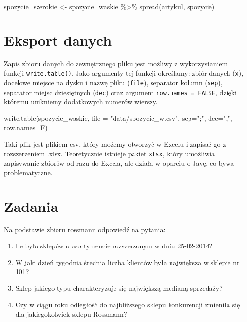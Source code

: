 \documentclass[
  letterpaper,
  DIV=11,
  numbers=noendperiod]{scrreprt}
\newenvironment{Shaded}{\begin{snugshade}}{\end{snugshade}}
\newcommand{\AttributeTok}[1]{\textcolor[rgb]{0.40,0.45,0.13}{#1}}
\newcommand{\FunctionTok}[1]{\textcolor[rgb]{0.28,0.35,0.67}{#1}}
\newcommand{\NormalTok}[1]{\textcolor[rgb]{0.00,0.23,0.31}{#1}}
\newcommand{\OtherTok}[1]{\textcolor[rgb]{0.00,0.23,0.31}{#1}}
\newcommand{\SpecialCharTok}[1]{\textcolor[rgb]{0.37,0.37,0.37}{#1}}
\newcommand{\StringTok}[1]{\textcolor[rgb]{0.13,0.47,0.30}{#1}}
\providecommand{\tightlist}{%
  \setlength{\itemsep}{0pt}\setlength{\parskip}{0pt}}\usepackage{longtable,booktabs,array}
\begin{document}
\begin{Shaded}
\begin{Highlighting}[]
\NormalTok{spozycie\_szerokie }\OtherTok{\textless{}{-}}\NormalTok{ spozycie\_waskie }\SpecialCharTok{\%\textgreater{}\%}
  \FunctionTok{spread}\NormalTok{(artykul, spozycie)}
\end{Highlighting}
\end{Shaded}

\hypertarget{eksport-danych}{%
\section{Eksport danych}\label{eksport-danych}}

Zapis zbioru danych do zewnętrznego pliku jest możliwy z wykorzystaniem
funkcji \texttt{write.table()}. Jako argumenty tej funkcji określamy:
zbiór danych (\texttt{x}), docelowe miejsce na dysku i nazwę pliku
(\texttt{file}), separator kolumn (\texttt{sep}), separator miejsc
dziesiętnych (\texttt{dec}) oraz argument \texttt{row.names\ =\ FALSE},
dzięki któremu unikniemy dodatkowych numerów wierszy.

\begin{Shaded}
\begin{Highlighting}[]
\FunctionTok{write.table}\NormalTok{(spozycie\_waskie, }\AttributeTok{file =} \StringTok{"data/spozycie\_w.csv"}\NormalTok{, }\AttributeTok{sep=}\StringTok{";"}\NormalTok{, }\AttributeTok{dec=}\StringTok{","}\NormalTok{, }\AttributeTok{row.names=}\NormalTok{F)}
\end{Highlighting}
\end{Shaded}

Taki plik jest plikiem csv, który możemy otworzyć w Excelu i zapisać go
z rozszerzeniem .xlsx. Teoretycznie istnieje pakiet \texttt{xlsx}, który
umożliwia zapisywanie zbiorów od razu do Excela, ale działa w oparciu o
Javę, co bywa problematyczne.

\hypertarget{zadania-2}{%
\section{Zadania}\label{zadania-2}}

Na podstawie zbioru rossmann odpowiedź na pytania:

\begin{enumerate}
\def\labelenumi{\arabic{enumi}.}
\tightlist
\item
  Ile było sklepów o asortymencie rozszerzonym w dniu 25-02-2014?
\item
  W jaki dzień tygodnia średnia liczba klientów była największa w
  sklepie nr 101?
\item
  Sklep jakiego typu charakteryzuje się największą medianą sprzedaży?
\item
  Czy w ciągu roku odległość do najbliższego sklepu konkurencji zmieniła
  się dla jakiegokolwiek sklepu Rossmann?
\end{enumerate}
\end{document}
